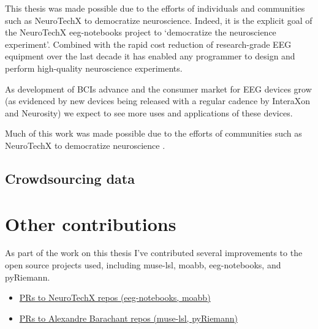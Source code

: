 \documentclass[a4paper]{article}
\begin{document}
\begin{refsection}

        This thesis was made possible due to the efforts of individuals and communities such as NeuroTechX to democratize neuroscience. Indeed, it is the explicit goal of the NeuroTechX eeg-notebooks project to `democratize the neuroscience experiment'. Combined with the rapid cost reduction of research-grade EEG equipment over the last decade it has enabled any programmer to design and perform high-quality neuroscience experiments.


        As development of BCIs advance and the consumer market for EEG devices grow (as evidenced by new devices being released with a regular cadence by InteraXon and Neurosity) we expect to see more uses and applications of these devices.

        Much of this work was made possible due to the efforts of communities such as NeuroTechX to democratize neuroscience .

    \subsection{Crowdsourcing data}


\section{Other contributions}

    As part of the work on this thesis I've contributed several improvements to the open source projects used, including muse-lsl, moabb, eeg-notebooks, and pyRiemann.

    \begin{itemize}
        \item \href{%
                https://github.com/search?q=org%
            }{PRs to NeuroTechX repos (eeg-notebooks, moabb)}
        \item \href{%
                https://github.com/search?q=org%
            }{PRs to Alexandre Barachant repos (muse-lsl, pyRiemann)}
    \end{itemize}


\end{refsection}
\end{document}
